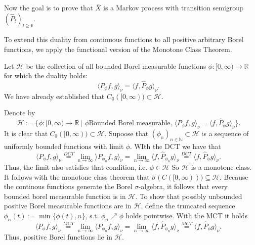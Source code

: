 \documentclass[a4paper,12pt,twoside]{article}
\begin{document}
Now the goal is to prove that $\bar{X}$ is a Markov process with transition semigroup $(\hat{P}_t)_{t \geq 0}$.

To extend this duality from continuous functions to all positive arbitrary Borel functions, we apply the functional version of the Monotone Class Theorem. 

Let $\mathcal{H}$ be the collection of all bounded Borel measurable functions $\phi: [0,\infty) \to \mathbb{R}$ for which the duality holds:
\[
    \langle P_\phi f, g \rangle_\nu = \langle f, \hat{P}_\phi g \rangle_\nu.
\]
We have already established that $C_0([0,\infty)) \subset \mathcal{H}$.

Denote by
\[
\mathcal{H} := \{ \phi: [0,\infty) \to \mathbb{R} \mid \phi \text{Bounded Borel measurable, } \langle P_\phi f,g \rangle_\nu = \langle f,\hat{P}_\phi g \rangle_\nu \}.
\]
It is clear that $C_0([0,\infty)) \subset \mathcal{H}$. Supoose that $(\phi_n)_{n \in \mathbb{N}} \subset \mathcal{H}$ is a sequence of uniformly bounded functions with limit $\phi$. WIth the DCT we have that 
\[
\langle P_\phi f,g \rangle_\nu \stackrel{DCT}{=} \lim_{n \to \infty} \rangle P_{\phi_n} f,g \rangle_\nu = \lim_{n \to \infty} \langle f,\hat{P}_{\phi_n} g \rangle_\nu  \stackrel{DCT}{=} \langle f,\hat{P}_\phi g \rangle_\nu.
\]
Thus, the limit also satisfies that condition, i.e. $\phi \in \mathcal{H}$ So $\mathcal{H}$ is a monotone class. It follows with the monotone class theorem that $\sigma (C([0,\infty) ))\subseteq \mathcal{H}$. Because the continous functions generate the Borel $\sigma$-algebra, it follows that every bounded borel measurable function is in $\mathcal{H}$. To show that possibly unbounded positive Borel measurable functions are in $\mathcal{H}$, define the truncated sequence $\phi_n (t) := \min \{ \phi(t),n \}$, s.t. $\phi_n \nearrow \phi$ holds pointwise. With the MCT it holds 
\[
\langle P_\phi f, g \rangle_\nu \stackrel{MCT}{=} \lim_{n \to \infty} \langle P_{\phi_n} f,g \rangle_\nu = \lim_{n \to \infty} \langle  f,\hat{P}_{\phi_n}g \rangle_\nu  \stackrel{MCT}{=} \langle f, \hat{P}_\phi g \rangle_\nu.
\]
Thus, positive Borel functions lie in $\mathcal{H}$.
\end{document}
